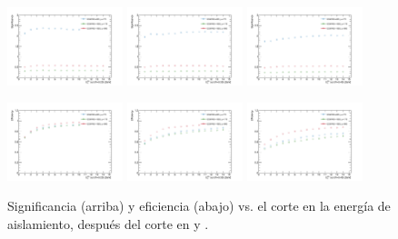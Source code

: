 \begin{figure}[th!]
  \centering
  \includegraphics[width=0.3\textwidth]{figures/iso_20_sig}
  \includegraphics[width=0.3\textwidth]{figures/iso_30_sig}
  \includegraphics[width=0.3\textwidth]{figures/iso_40_sig}

  \includegraphics[width=0.3\textwidth]{figures/iso_20_eff}
  \includegraphics[width=0.3\textwidth]{figures/iso_30_eff}
  \includegraphics[width=0.3\textwidth]{figures/iso_40_eff}

  \caption{Significancia (arriba) y eficiencia (abajo) vs. el corte en la energía de
    aislamiento, después del corte en {\pt} y {\met}.}
  \label{fig:photon_iso_sig}
\end{figure}


